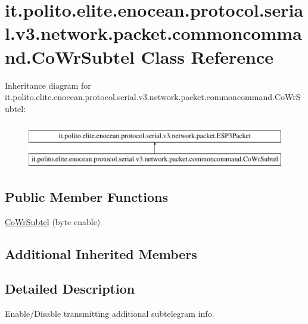 \hypertarget{classit_1_1polito_1_1elite_1_1enocean_1_1protocol_1_1serial_1_1v3_1_1network_1_1packet_1_1commoncommand_1_1_co_wr_subtel}{}\section{it.\+polito.\+elite.\+enocean.\+protocol.\+serial.\+v3.\+network.\+packet.\+commoncommand.\+Co\+Wr\+Subtel Class Reference}
\label{classit_1_1polito_1_1elite_1_1enocean_1_1protocol_1_1serial_1_1v3_1_1network_1_1packet_1_1commoncommand_1_1_co_wr_subtel}
Inheritance diagram for it.\+polito.\+elite.\+enocean.\+protocol.\+serial.\+v3.\+network.\+packet.\+commoncommand.\+Co\+Wr\+Subtel\+:\begin{figure}[H]
\begin{center}
\leavevmode
\includegraphics[height=2.000000cm]{classit_1_1polito_1_1elite_1_1enocean_1_1protocol_1_1serial_1_1v3_1_1network_1_1packet_1_1commoncommand_1_1_co_wr_subtel}
\end{center}
\end{figure}
\subsection*{Public Member Functions}
\begin{DoxyCompactItemize}
\item 
\hyperlink{classit_1_1polito_1_1elite_1_1enocean_1_1protocol_1_1serial_1_1v3_1_1network_1_1packet_1_1commoncommand_1_1_co_wr_subtel_a5ab3d9770286b2470e1174b5befb6e35}{Co\+Wr\+Subtel} (byte enable)
\end{DoxyCompactItemize}
\subsection*{Additional Inherited Members}


\subsection{Detailed Description}
Enable/\+Disable transmitting additional subtelegram info.

